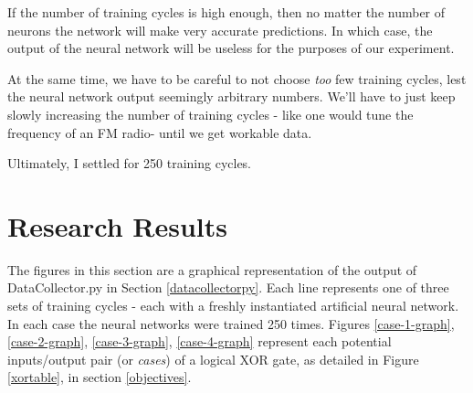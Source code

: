 \documentclass[12pt]{article}
\begin{document}
If the number of training cycles is high enough, then no matter the number of neurons the network will make very accurate predictions. In which case, the output of the neural network will be useless for the purposes of our experiment.

At the same time, we have to be careful to not choose \textit{too} few training cycles, lest the neural network output seemingly arbitrary numbers. We'll have to just keep slowly increasing the number of training cycles - like one would tune the frequency of an FM radio- until we get workable data.

Ultimately, I settled for 250 training cycles.

\section{Research Results \label{results}}

The figures in this section are a graphical representation of the output of DataCollector.py in Section \ref{datacollectorpy}. Each line represents one of three sets of training cycles - each with a freshly instantiated artificial neural network. In each case the neural networks were trained 250 times. Figures \ref{case-1-graph}, \ref{case-2-graph}, \ref{case-3-graph}, \ref{case-4-graph} represent each potential inputs/output pair  (or \textit{cases}) of a logical XOR gate, as detailed in Figure \ref{xortable}, in section \ref{objectives}.
\end{document}
